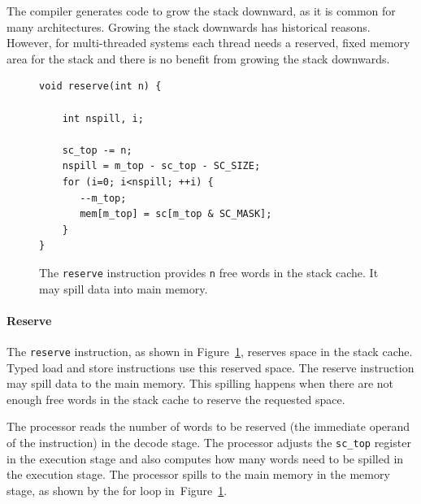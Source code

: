 \documentclass[a4paper,fontsize=10pt,twoside,DIV15,BCOR12mm,headinclude=true,footinclude=false,pagesize,bibtotoc]{scrbook}
\newcommand{\code}[1]{{\texttt{#1}}}
\begin{document}
The compiler generates code to grow the stack downward,
as it is common for many architectures. Growing the stack downwards
has historical reasons. However, for multi-threaded
systems each thread needs a reserved, fixed memory area
for the stack and there is no benefit from growing the stack
downwards.

%
%
%
%
%
%

\begin{figure}
\begin{lstlisting}
void reserve(int n) {

    int nspill, i;

    sc_top -= n;
    nspill = m_top - sc_top - SC_SIZE;
    for (i=0; i<nspill; ++i) {
       --m_top;
       mem[m_top] = sc[m_top & SC_MASK];
    }
}
	\end{lstlisting}
 	 \caption{The \code{reserve} instruction provides \code{n}
	 free words in the stack cache. It may spill data into main memory.}
 	 \label{fig:res_iml}
\end{figure}


\paragraph{Reserve} The \code{reserve} instruction, as shown in Figure~\ref{fig:res_iml},
reserves space in the stack cache. Typed load and store instructions use
this reserved space. The reserve instruction may spill data to the
main memory. This spilling happens when there are not enough free words in the
stack cache to reserve the requested space.

The processor reads the number of words to be reserved
(the immediate operand of the instruction) in the decode stage.
The processor adjusts the \code{sc\_top} register in the execution
stage and also computes how many words need to be spilled in the
execution stage. The processor spills to the main memory
in the memory stage, as shown by the for loop in~Figure~\ref{fig:res_iml}.
\end{document}
